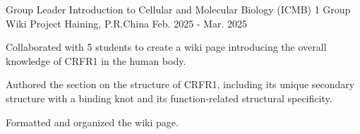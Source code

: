 \begin{cventries}
  \cventry
    {Group Leader} %
    {Introduction to Cellular and Molecular Biology (ICMB) 1 Group Wiki Project} %
    {Haining, P.R.China} %
    {Feb. 2025 - Mar. 2025} %
    {
      \begin{cvitems} %
        \item {Collaborated with 5 students to create a wiki page introducing the overall knowledge of CRFR1 in the human body.}
        \item {Authored the section on the structure of CRFR1, including its unique secondary structure with a binding knot and its function-related structural specificity.}
        \item {Formatted and organized the wiki page.}
      \end{cvitems}
    }
    
\end{cventries}
